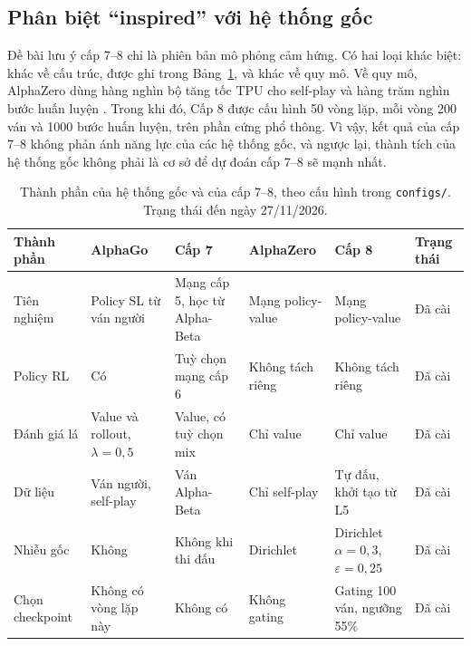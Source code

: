 \subsection{Phân biệt ``inspired'' với hệ thống gốc}
\label{sec:lt-inspired}
Đề bài lưu ý cấp 7--8 chỉ là phiên bản mô phỏng cảm hứng. Có hai loại khác biệt: khác về cấu trúc, được ghi trong Bảng~\ref{tab:lt-inspired}, và khác về quy mô. Về quy mô, AlphaZero dùng hàng nghìn bộ tăng tốc TPU cho self-play và hàng trăm nghìn bước huấn luyện \cite{silver2018alphazero}. Trong khi đó, Cấp 8 được cấu hình 50 vòng lặp, mỗi vòng 200 ván và \num{1000} bước huấn luyện, trên phần cứng phổ thông. Vì vậy, kết quả của cấp 7--8 không phản ánh năng lực của các hệ thống gốc, và ngược lại, thành tích của hệ thống gốc không phải là cơ sở để dự đoán cấp 7--8 sẽ mạnh nhất.

\begin{table}[!htb]
  \centering\small
  \caption{Thành phần của hệ thống gốc và của cấp 7--8, theo cấu hình trong \texttt{configs/}. Trạng thái đến ngày 27/11/2026.}
  \label{tab:lt-inspired}
  \begin{tabularx}{\textwidth}{@{}>{\raggedright\arraybackslash}p{} >{\raggedright\arraybackslash}X >{\raggedright\arraybackslash}X >{\raggedright\arraybackslash}X >{\raggedright\arraybackslash}X l@{}}
    \toprule
    \textbf{Thành phần} & \textbf{AlphaGo} & \textbf{Cấp 7} & \textbf{AlphaZero} & \textbf{Cấp 8} & \textbf{Trạng thái} \\
    \midrule
    Tiên nghiệm & Policy SL từ ván người & Mạng cấp 5, học từ Alpha-Beta & Mạng policy-value & Mạng policy-value & Đã cài \\
    Policy RL & Có & Tuỳ chọn mạng cấp 6 & Không tách riêng & Không tách riêng & Đã cài \\
    Đánh giá lá & Value và rollout, $\lambda = 0{,}5$ & Value, có tuỳ chọn mix & Chỉ value & Chỉ value & Đã cài \\
    Dữ liệu & Ván người, self-play & Ván Alpha-Beta & Chỉ self-play & Tự đấu, khởi tạo từ L5 & Đã cài \\
    Nhiễu gốc & Không & Không khi thi đấu & Dirichlet & Dirichlet $\alpha = 0{,}3$, $\varepsilon = 0{,}25$ & Đã cài \\
    Chọn checkpoint & Không có vòng lặp này & Không có & Không gating & Gating 100 ván, ngưỡng 55\% & Đã cài \\
    \bottomrule
  \end{tabularx}
\end{table}

